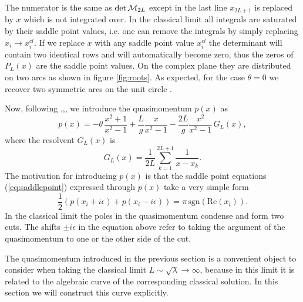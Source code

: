 \label{eq:PLrepr}
\eeq
The numerator is the same as $\det {\cal M}_{2L}$ except in the last line $x_{2L+1}$ is replaced by $x$ which is not integrated over. In the classical limit all integrals are saturated by their saddle point values, i.e. one can remove the integrals by simply replacing $x_i \rightarrow x_i^{cl}$. If we replace $x$ with any saddle point value $x_i^{cl}$ the determinant will contain two identical rows and will automatically become zero, thus the zeros of $P_L(x)$ are the saddle point values. On the complex plane they are distributed on two arcs as shown in figure \ref{fig:roots}. As expected, for the case $\theta=0$ we recover two symmetric arcs on the unit circle \cite{Gromov:2012eu}.


Now, following \cite{Gromov:2007aq},\cite{Beisert:2005bm},\cite{Gromov:2012eu}, we introduce the quasimomentum $p(x)$ as
\begin{equation}
	p(x) = -\theta \, \frac{x^2 + 1}{x^2 - 1} + \frac{L}{g} \frac{x}{x^2 - 1} - \frac{2L}{g} \frac{x^2}{x^2 - 1} \, G_L(x),
	\label{eq:quantum_quasimomentum}
\end{equation}
where the resolvent $G_L(x)$ is
\begin{equation}
	G_L(x) = \frac{1}{2L} \sum_{k=1}^{2L+1} \frac{1}{x-x_k}.
	\label{eq:resolvent}
\end{equation}
The motivation for introducing $p(x)$ is that  the saddle point equations (\ref{eq:saddlepoint}) expressed through $p(x)$ take a very simple form
\begin{equation}
	\frac{1}{2} \left( p(x_i + i \epsilon) + p(x_i - i \epsilon) \right) = \pi \, \mathrm{sgn}(\mathrm{Re}(x_i)).
	\label{eq:pepsilon}
\end{equation}
In the classical limit the poles in the quasimomentum condense and form two cuts. The shifts $\pm i\epsilon$ in the equation above refer to taking the argument of the quasimomentum to one or the other side of the cut.


The quasimomentum  introduced in the previous section is a convenient object to consider when taking the classical limit $L\sim \sqrt \lambda\rightarrow\infty$, because in this limit it is related to the algebraic curve of the corresponding classical solution. In this section we will construct this curve explicitly.

